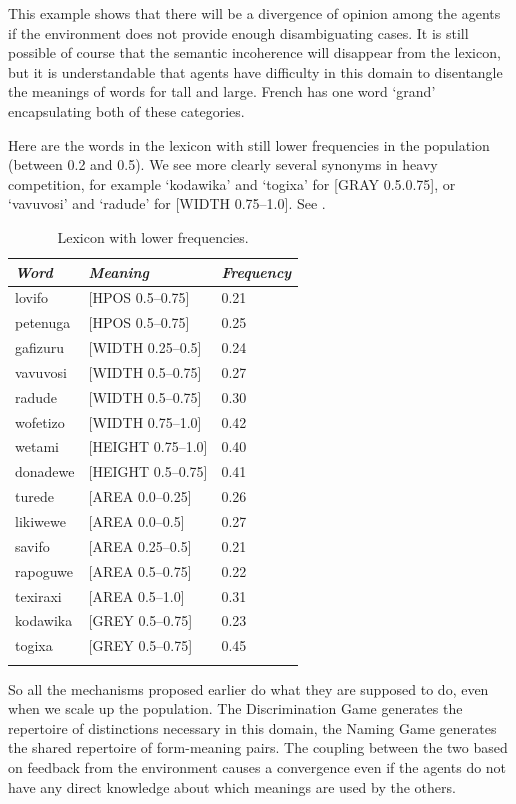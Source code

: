 This example shows that there will be a divergence of 
opinion among the agents if the environment does not 
provide enough 
disambiguating cases. It is still possible of course that 
the semantic incoherence will disappear from the lexicon, 
but it is understandable that agents have difficulty 
in this domain to disentangle the meanings of words for 
tall and large. French has one word `grand' encapsulating
both of these categories.

Here are the words in the lexicon with still lower 
frequencies in the population (between 0.2 and 0.5). We see
more clearly several synonyms in heavy competition, for example 
`kodawika' and `togixa' for [GRAY 0.5.0.75], or 
`vavuvosi' and `radude' for [WIDTH 0.75–1.0]. See . 


\begin{table}
\begin{center}
\begin{tabular}{ l  l  l }
\lsptoprule
{\itshape Word}&{\itshape Meaning} & {\itshape Frequency} \\ \midrule
lovifo & [HPOS 0.5–0.75] & 0.21 \\ 
petenuga & [HPOS 0.5–0.75] & 0.25 \\ 
gafizuru & [WIDTH 0.25–0.5] & 0.24 \\ 
vavuvosi & [WIDTH 0.5–0.75] & 0.27 \\ 
radude & [WIDTH 0.5–0.75] & 0.30 \\ 
wofetizo & [WIDTH 0.75–1.0] & 0.42 \\ 
wetami & [HEIGHT 0.75–1.0] & 0.40 \\ 
donadewe & [HEIGHT 0.5–0.75] & 0.41 \\ 
turede & [AREA 0.0–0.25] & 0.26 \\ 
likiwewe & [AREA 0.0–0.5] & 0.27 \\ 
savifo & [AREA 0.25–0.5] & 0.21 \\ 
rapoguwe & [AREA 0.5–0.75] & 0.22 \\ 
texiraxi & [AREA 0.5–1.0] & 0.31 \\ 
kodawika & [GREY 0.5–0.75] & 0.23 \\ 
togixa & [GREY 0.5–0.75] & 0.45 \\ 
\lspbottomrule
\end{tabular}
\caption{\label{tab:comp}Lexicon with lower frequencies.}
\end{center}
\end{table}

So all the mechanisms proposed earlier 
do what they are supposed to do, even when we 
scale up the population. The Discrimination 
Game generates the repertoire of distinctions 
necessary in this domain, the Naming Game generates
the shared repertoire of form-meaning pairs. The 
coupling between the two based on feedback from 
the environment causes a convergence even if the
agents do not have any direct knowledge about 
which meanings are used by the others. 

